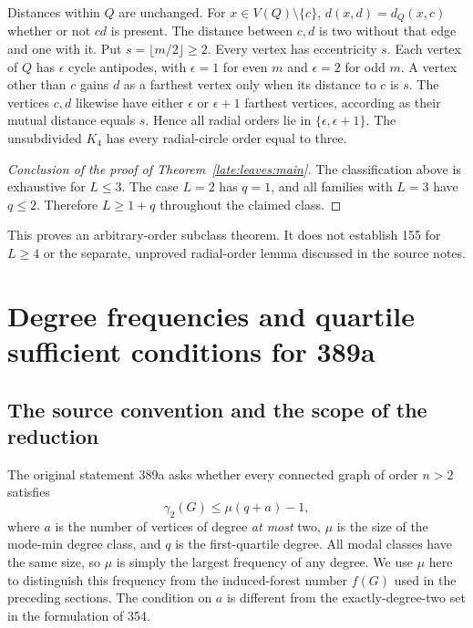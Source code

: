 \documentclass[11pt,a4paper]{article}
\theoremstyle{definition}\newtheorem{definition}[theorem]{Definition}
\theoremstyle{remark}\newtheorem{remark}[theorem]{Remark}
\begin{document}
Distances within $Q$ are unchanged. For $x\in V(Q)\setminus\{c\}$,
$d(x,d)=d_Q(x,c)$ whether or not $cd$ is present. The distance between
$c,d$ is two without that edge and one with it. Put
$s=\lfloor m/2\rfloor\ge2$. Every vertex has eccentricity $s$.
Each vertex of $Q$ has $\epsilon$ cycle antipodes, with $\epsilon=1$
for even $m$ and $\epsilon=2$ for odd $m$. A vertex other than $c$ gains
$d$ as a farthest vertex only when its distance to $c$ is $s$.
The vertices $c,d$ likewise have either $\epsilon$ or $\epsilon+1$
farthest vertices, according as their mutual distance equals $s$.
Hence all radial orders lie in $\{\epsilon,\epsilon+1\}$.
The unsubdivided $K_4$ has every radial-circle order equal to three.

\begin{proof}[Conclusion of the proof of Theorem~\ref{late:leaves:main}]
The classification above is exhaustive for $L\le3$. The case $L=2$
has $q=1$, and all families with $L=3$ have $q\le2$. Therefore
$L\ge1+q$ throughout the claimed class.
\end{proof}
This proves an arbitrary-order subclass theorem. It does not establish
155 for $L\ge4$ or the separate, unproved radial-order lemma discussed
in the source notes.


\section{Degree frequencies and quartile sufficient conditions for 389a}\label{late:389a}

\subsection{The source convention and the scope of the reduction}
The original statement 389a asks whether every connected graph of order
$n>2$ satisfies
\begin{equation}\label{late:389a:target}
 \gamma_2(G)\le \mu(q+a)-1,
\end{equation}
where $a$ is the number of vertices of degree \emph{at most} two, $\mu$
is the size of the mode-min degree class, and $q$ is the first-quartile
degree. All modal classes have the same size, so $\mu$ is simply the
largest frequency of any degree. We use $\mu$ here to distinguish this
frequency from the induced-forest number $f(G)$ used in the preceding
sections. The condition on $a$ is different from the exactly-degree-two
set in the formulation of 354.
\end{document}
